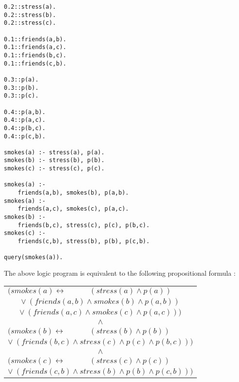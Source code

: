\begin{code}
\begin{verbatim}
0.2::stress(a).
0.2::stress(b).
0.2::stress(c).

0.1::friends(a,b).
0.1::friends(a,c).
0.1::friends(b,c).
0.1::friends(c,b).

0.3::p(a).
0.3::p(b).
0.3::p(c).

0.4::p(a,b).
0.4::p(a,c).
0.4::p(b,c).
0.4::p(c,b).

smokes(a) :- stress(a), p(a).
smokes(b) :- stress(b), p(b).
smokes(c) :- stress(c), p(c).

smokes(a) :- 
    friends(a,b), smokes(b), p(a,b).
smokes(a) :-
    friends(a,c), smokes(c), p(a,c).
smokes(b) :- 
    friends(b,c), stress(c), p(c), p(b,c).
smokes(c) :- 
    friends(c,b), stress(b), p(b), p(c,b).

query(smokes(a)).
\end{verbatim}
\label{code:base}
\vspace{0.5cm}
\end{code}

\noindent The above logic program is equivalent to the following propositional formula :
\begin{center}
\begin{tabular}{ll}
$(smokes(a)\leftrightarrow$ & $(stress(a) \land p(a))$\\
\multicolumn{2}{c}{$\lor\ (friends(a,b) \land smokes(b) \land p(a,b))$}\\
\multicolumn{2}{c}{$\lor\ (friends(a,c) \land smokes(c) \land p(a,c)))$}\\
\multicolumn{2}{c}{$\land$}\\
$(smokes(b)\leftrightarrow$ & $(stress(b) \land p(b))$\\
\multicolumn{2}{c}{$\lor\ (friends(b,c) \land stress(c) \land p(c) \land p(b,c)))$}\\
\multicolumn{2}{c}{$\land$}\\
$(smokes(c)\leftrightarrow$ & $(stress(c) \land p(c))$\\
\multicolumn{2}{c}{$\lor\ (friends(c,b) \land stress(b) \land p(b) \land p(c,b)))$}\\
\end{tabular}
\end{center}

